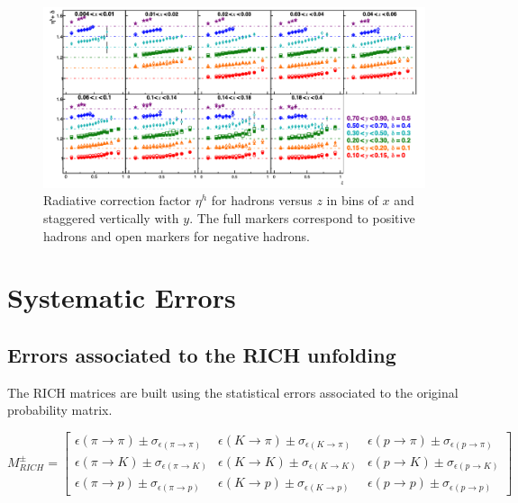 \documentclass[letterpaper,12pt]{article}
\begin{document}
\begin{figure}
	\includegraphics[scale=0.5]{./gfx/RadCor.png}
	\caption{Radiative correction factor $\eta^{h}$ for hadrons versus $z$ in bins of $x$ and staggered vertically with $y$. The full markers correspond to positive hadrons and open markers for negative hadrons.}
	\label{RadCor}
\end{figure}

\newpage

\section{Systematic Errors} \label{Sys}

\subsection{Errors associated to the RICH unfolding}

The RICH matrices are built using the statistical errors associated to the original probability matrix.

\begin{equation}
M^{\pm}_{RICH}
=
\begin{bmatrix}
\epsilon(\pi \rightarrow \pi)\pm\sigma_{\epsilon(\pi \rightarrow \pi)} & \epsilon(K \rightarrow \pi)\pm\sigma_{\epsilon(K \rightarrow \pi)} & \epsilon(p \rightarrow \pi)\pm\sigma_{\epsilon(p \rightarrow \pi)}\\
\epsilon(\pi \rightarrow K)\pm\sigma_{\epsilon(\pi \rightarrow K)} & \epsilon(K \rightarrow K)\pm\sigma_{\epsilon(K \rightarrow K)} & \epsilon(p \rightarrow K)\pm\sigma_{\epsilon(p \rightarrow K)} \\
\epsilon(\pi \rightarrow p)\pm\sigma_{\epsilon(\pi \rightarrow p)} & \epsilon(K \rightarrow p)\pm\sigma_{\epsilon(K \rightarrow p)} & \epsilon(p \rightarrow p)\pm\sigma_{\epsilon(p \rightarrow p)}
\end{bmatrix}
\end{equation}
\end{document}
